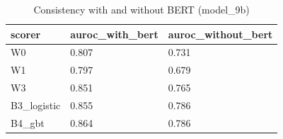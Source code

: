 \begin{table}[t]
\centering
\small
\begin{tabular}{lll}
\hline
scorer & auroc\_with\_bert & auroc\_without\_bert \\
\hline
W0 & 0.807 & 0.731 \\
W1 & 0.797 & 0.679 \\
W3 & 0.851 & 0.765 \\
B3\_logistic & 0.855 & 0.786 \\
B4\_gbt & 0.864 & 0.786 \\
\hline
\end{tabular}
\caption{Consistency with and without BERT (model\_9b)}
\label{tab:bert_model_9b}
\end{table}
